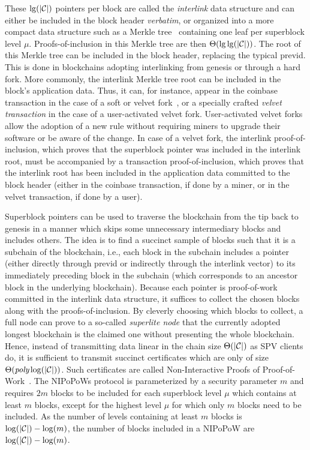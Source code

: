 These $\lg(|\mathcal{C}|)$ pointers per block are called the \emph{interlink} data
structure and can either be included in the block header \emph{verbatim}, or
organized into a more compact data structure such as a Merkle tree~\cite{merkle}
 containing one leaf per superblock level $\mu$.
Proofs-of-inclusion in this Merkle tree are then $\Theta(\lg\lg(|\mathcal{C}|))$. The
root of this Merkle tree can be included in the block header, replacing the
typical \textsf{previd}. This is done in blockchains adopting interlinking from
genesis or through a hard fork. More commonly, the interlink Merkle tree root
can be included in the block's application data. Thus, it can, for instance,
appear in the coinbase transaction in the case of a soft or velvet
fork~\cite{velvet}, or a specially crafted \emph{velvet transaction} in the case
of a user-activated velvet fork. User-activated velvet forks allow the adoption
of a new rule without requiring miners to upgrade their software or be aware of
the change. In case of a velvet fork, the interlink proof-of-inclusion, which
proves that the superblock pointer was included in the interlink root, must be
accompanied by a transaction proof-of-inclusion, which proves that the interlink
root has been included in the application data committed to the block header
(either in the coinbase transaction, if done by a miner, or in the velvet
transaction, if done by a user).

Superblock pointers can be used to traverse the blockchain from the tip back to
genesis in a manner which skips some unnecessary intermediary blocks and
includes others. The idea is to find a succinct sample of blocks such that it is
a subchain of the blockchain, i.e., each block in the subchain includes a
pointer (either directly through \textsf{previd} or indirectly through the
interlink vector) to its immediately preceding block in the subchain (which
corresponds to an ancestor block in the underlying blockchain). Because each
pointer is proof-of-work committed in the interlink data structure, it suffices
to collect the chosen blocks along with the proofs-of-inclusion. By cleverly
choosing which blocks to collect, a full node can prove to a so-called
\emph{superlite node} that the currently adopted longest blockchain is the
claimed one without presenting the whole blockchain. Hence, instead of
transmitting data linear in the chain size $\Theta(|\mathcal{C}|)$ as SPV clients do,
it is sufficient to transmit succinct certificates which are only of size
$\Theta(\emph{poly}\log(|\mathcal{C}|))$. Such certificates are called Non-Interactive
Proofs of Proof-of-Work~\cite{nipopows}. The NIPoPoWs protocol is parameterized
by a security parameter $m$ and requires $2m$ blocks to be included for each
superblock level $\mu$ which contains at least $m$ blocks, except for the
highest level $\mu$ for which only $m$ blocks need to be included. As the number
of levels containing at least $m$ blocks is $\log(|\mathcal{C}|) - \log(m)$, the
number of blocks included in a NIPoPoW are $\log(|\mathcal{C}|) - \log(m)$.
